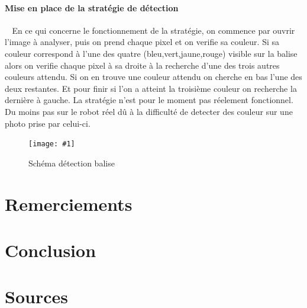\documentclass[12pt]{article}
\def\tab{$\>\>\>\>$}
\newcommand\img[2]{
\begin{figure}[!h]
  \centering
    \texttt{[image: \#1]}
  \caption{#2}
  \label{img:#1}
\end{figure}
}
\begin{document}
\paragraph{Mise en place de la stratégie de détection\\}
\tab En ce qui concerne le fonctionnement de la stratégie, on commence par ouvrir l'image à analyser, puis on prend chaque pixel et on verifie sa couleur. Si sa couleur correspond à l'une des quatre (bleu,vert,jaune,rouge) visible sur la balise alors on verifie chaque pixel à sa droite à la recherche d'une des trois autres couleurs attendu. Si on en trouve une couleur attendu on cherche en bas l'une des deux restantes. Et pour finir si l'on a atteint la troisième couleur on recherche la dernière à gauche. La stratégie n'est pour le moment pas réelement fonctionnel. Du moins pas sur le robot réel dû à la difficulté de detecter des couleur sur une photo prise par celui-ci.

\img{Images/baliseschema.png}{Schéma détection balise}

\newpage

\section{Remerciements}

\newpage

\section{Conclusion}

\newpage

\section{Sources}
\end{document}
